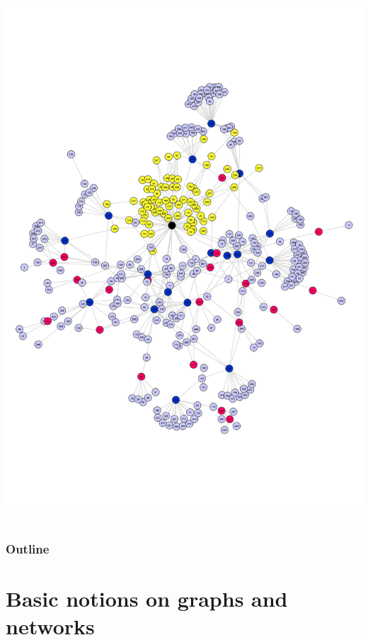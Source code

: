 \documentclass{beamer}\usepackage[]{graphicx}\usepackage[]{color}
\begin{document}
\begin{frame}
\begin{columns}
\begin{column}{.55\textwidth}
      \includegraphics[width=\textwidth]{figures/net_reg_ecoli}
    \end{column}
  \end{columns}
\end{frame}


\begin{frame}
  \frametitle{Outline}
  \tableofcontents[hideallsubsections]
\end{frame}

\section{Basic notions on graphs and networks}
\end{document}
